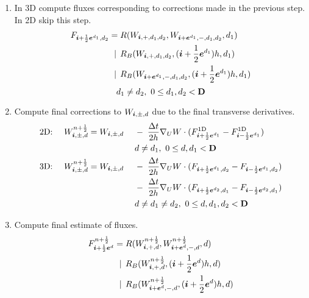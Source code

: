 \begin{enumerate}
\item In 3D compute fluxes corresponding to corrections made in the previous
step.  In 2D skip this step.
\begin{equation} \label{eqn:riemann2}
\begin{split} 
F_{{\boldsymbol{i}} + \frac{1}{2} {\boldsymbol{e}}^{d_1}, d_2}
=   \; & R(W_{{\boldsymbol{i}}, +, d_1, d_2}, 
           W_{{\boldsymbol{i}} + {\boldsymbol{e}}^{d_1}, -, d_1, d_2}, d_1) \\
| \,\; & R_B(W_{{\boldsymbol{i}},                +, d_1, d_2}, 
         ({\boldsymbol{i}} + \frac{1}{2} {\boldsymbol{e}}^{d_1})h, d_1) \\
| \,\; & R_B(W_{{\boldsymbol{i}} + {\boldsymbol{e}}^{d_1}, -, d_1, d_2}, 
         ({\boldsymbol{i}} + \frac{1}{2} {\boldsymbol{e}}^{d_1})h, d_1)
\end{split}
\end{equation}
\begin{equation*}
d_1 \neq d_2, ~ 0 \le d_1, d_2 < {\mathbf{D}}
\end{equation*}

\item Compute final corrections to $W_{{\boldsymbol{i}}, \pm, d}$ due to
the final transverse derivatives.
\begin{alignat}{2}
\label{eqn:updateprim2-2D}
\text{2D:}~~~~
 W^{n+\frac{1}{2}}_{{\boldsymbol{i}}, \pm, d} = \; & 
    W_{{\boldsymbol{i}}, \pm, d} \; & & - \; \frac{\Delta t}{2h} \nabla_U W \cdot
 (F^{\text{1D}}_{{\boldsymbol{i}} + \frac{1}{2} {\boldsymbol{e}}^{d_1}}
                       - F^{\text{1D}}_{{\boldsymbol{i}} - \frac{1}{2} {\boldsymbol{e}}^{d_1}}) \\
 & & & d \neq d_1, ~ 0 \le d, d_1 < {\mathbf{D}} \notag \\
\label{eqn:updateprim2-3D}
\text{3D:}~~~~
 W^{n+\frac{1}{2}}_{{\boldsymbol{i}}, \pm, d} = \; & W_{{\boldsymbol{i}}, \pm, d}
 \; & & - \; \frac{\Delta t}{2h}\nabla_U W \cdot
                         (F_{{\boldsymbol{i}} + \frac{1}{2} {\boldsymbol{e}}^{d_1}, d_2}
                        - F_{{\boldsymbol{i}} - \frac{1}{2} {\boldsymbol{e}}^{d_1}, d_2}) \\
 & \; & & - \; \frac{\Delta t}{2h} \nabla_U W \cdot
                        (F_{{\boldsymbol{i}} + \frac{1}{2} {\boldsymbol{e}}^{d_2}, d_1}
                       - F_{{\boldsymbol{i}} - \frac{1}{2} {\boldsymbol{e}}^{d_2}, d_1}) \notag \\
 & & & d \neq d_1 \neq d_2, ~ 0 \le d, d_1, d_2 < {\mathbf{D}} \notag
\end{alignat}

\item Compute final estimate of fluxes.
\begin{equation} \label{eqn:riemann3}
\begin{split}
F^{n+\frac{1}{2}}_{{\boldsymbol{i}} + \frac{1}{2} {\boldsymbol{e}}^d} =
    \; & R  (W^{n+\frac{1}{2}}_{{\boldsymbol{i}}, +, d},
             W^{n+\frac{1}{2}}_{{\boldsymbol{i}} + {\boldsymbol{e}}^d, -, d}, d) \\ 
| \,\; & R_B(W^{n+\frac{1}{2}}_{{\boldsymbol{i}},            +, d},
             ({\boldsymbol{i}} + \frac{1}{2} {\boldsymbol{e}}^d)h, d) \\ 
| \,\; & R_B(W^{n+\frac{1}{2}}_{{\boldsymbol{i}} + {\boldsymbol{e}}^d, -, d},
             ({\boldsymbol{i}} + \frac{1}{2} {\boldsymbol{e}}^d)h, d)
\end{split}
\end{equation}


\end{enumerate}
